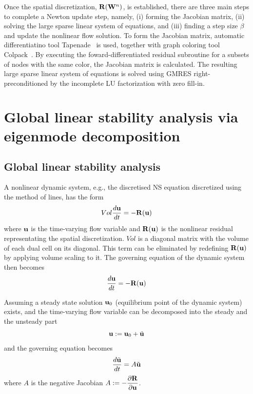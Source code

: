 \documentclass[journal,final]{new-aiaa}
\begin{document}
Once the spatial discretization,  $\mathbf{R}(\mathbf{W}^n)$, is established,
there are three main steps to complete a Newton update step,
namely, (i) forming the Jacobian matrix, (ii)
solving the large sparse linear system of equations,
and (iii) finding a step size $\beta$ and update the nonlinear
flow solution.
To form the Jacobian matrix, automatic differentiatino tool Tapenade~\cite{Tapenade}
is used, together with graph coloring tool Colpack~\cite{gebremedhin2013colpack}.
By executing the
foward-differentiated residual subroutine for a subsets of nodes
with the same color, the Jacobian matrix is calculated. The resulting
large sparse linear system of equations is solved using GMRES
right-preconditioned by the incomplete LU factorization with zero
fill-in. 



\section{Global linear stability analysis via eigenmode decomposition}
\label{label:sec2}
\subsection{Global linear stability analysis}
A nonlinear dynamic system, e.g., the discretised NS equation discretized
using the method of lines,
has the form
\begin{equation*}
Vol \dfrac{d\mathbf{u}}{dt}=-\mathbf{R}(\mathbf{u})
\end{equation*}
where $\mathbf{u}$ is the time-varying flow variable and $\mathbf{R}(\mathbf{u})$ is the nonlinear
residual representating the spatial discretization.
$Vol$ is a diagonal matrix with the volume of each dual cell on its diagonal.
This term can be eliminated by redefining $\mathbf{R}(\mathbf{u})$ by applying volume
scaling to it. The governing equation of the dynamic system then becomes
\begin{equation*}
\dfrac{d\mathbf{u}}{dt}=-\mathbf{R}(\mathbf{u})
\end{equation*}

Assuming a steady state solution $\mathbf{u}_0$ (equilibrium point of the dynamic system)
exists, and the time-varying flow variable can be decomposed into the
steady and the unsteady part 
\begin{equation*}
\mathbf{u}:=\mathbf{u}_0 + \tilde {\mathbf{u}}
\end{equation*}
and the governing equation becomes
\begin{equation*}
\dfrac{d \tilde {\mathbf{u}}}{dt}=A \tilde {\mathbf{u}}
\end{equation*}
where $A$ is the negative Jacobian $A:=-\dfrac{\partial\mathbf{R}}{\partial\mathbf{u}}$.
\end{document}

